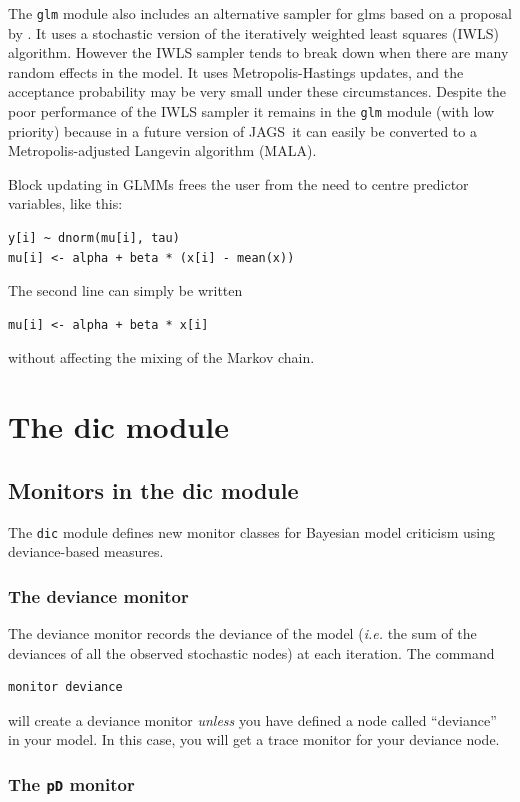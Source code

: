 \documentclass[11pt, a4paper, titlepage]{report}
\newcommand{\JAGS}{\textsf{JAGS}}
\begin{document}
{The \texttt{glm} module also includes an alternative sampler for glms
based on a proposal by \citet{Gamerman97}. It uses a stochastic
version of the iteratively weighted least squares (IWLS)
algorithm. However the IWLS sampler tends to break down when there are
many random effects in the model. It uses Metropolis-Hastings updates,
and the acceptance probability may be very small under these
circumstances. Despite the poor performance of the IWLS sampler it
remains in the \texttt{glm} module (with low priority) because in a
future version of \JAGS\ it can easily be converted to a
Metropolis-adjusted Langevin algorithm (MALA).

Block updating in GLMMs frees the user from the need to centre
predictor variables, like this:
\begin{verbatim}
y[i] ~ dnorm(mu[i], tau)
mu[i] <- alpha + beta * (x[i] - mean(x))
\end{verbatim}
The second line can simply be written
\begin{verbatim}
mu[i] <- alpha + beta * x[i]
\end{verbatim}
without affecting the mixing of the Markov chain.  


\chapter{The dic module}
\label{chapter:dic}

\section{Monitors in the dic module}

The \texttt{dic} module defines new monitor classes for Bayesian model
criticism using deviance-based measures. 

\subsection{The deviance monitor}

The deviance monitor records the deviance of the model ({\em i.e.} the
sum of the deviances of all the observed stochastic nodes) at each
iteration. The command
\begin{verbatim}
monitor deviance
\end{verbatim}
will create a deviance monitor {\em unless} you have defined a node
called ``deviance'' in your model. In this case, you will get a trace
monitor for your deviance node.

\subsection{The \texttt{pD} monitor}

}
\end{document}

